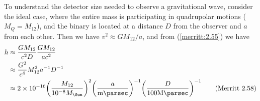 \documentclass[degn-notes.tex]{subfiles}
\begin{document}
To understand the detector size needed to observe a gravitational wave, consider the ideal case, where the entire mass is participating in quadrupolar motions ($M_Q = M_{12}$), and the binary is located at a distance $D$ from the observer and $a$ from each other. Then we have $v^2 \approx G M_{12} / a$, and from (\ref{merritt:2.55}) we have
%
\begin{align*}
  h &\approx
  \frac{G M_{12}}{c^2 D} \frac{G M_{12}}{a c^2}
  \\ &\approx
  \frac{G^2}{c^4} M_{12}^2 a^{-1} D^{-1}
  \\ &\approx
  \num{2e-16}
    \qty(\frac{M_{12}}{10^{-8} M_{\Sun}})^2
    \qty(\frac{a}{\si{\milli\parsec}})^{-1}
    \qty(\frac{D}{100\si{\mega\parsec}})^{-1}
%
  \tag{Merritt 2.58}
  \label{merritt:2.58}
\end{align*}
\end{document}
